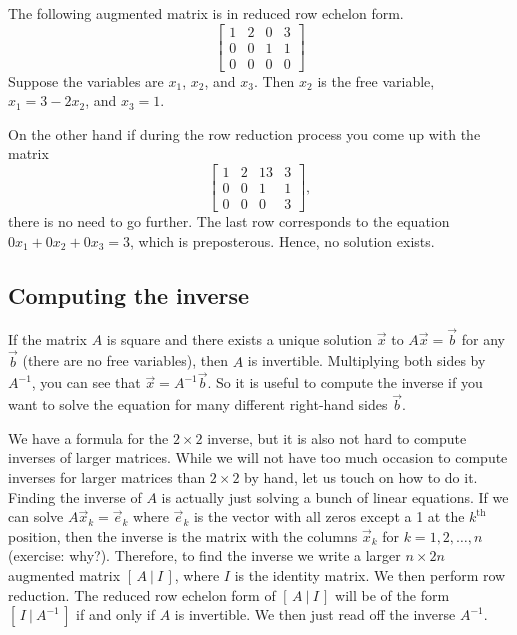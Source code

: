 \documentclass{ximera}
\begin{document}
\begin{example}
    The following augmented matrix is in reduced row echelon form.
    \begin{equation*}
        \left[
            \begin{array}{ccc|c}
                1 & 2 & 0 & 3 \\
                0 & 0 & 1 & 1 \\
                0 & 0 & 0 & 0
            \end{array}
        \right]
    \end{equation*}
    Suppose the variables are $x_1$, $x_2$, and $x_3$.  Then $x_2$ is the free variable, $x_1 = 3 - 2x_2$, and $x_3 = 1$.
    
    On the other hand if during the row reduction process you come up with the matrix
    \begin{equation*}
        \left[
            \begin{array}{ccc|c}
                1 & 2 & 13 & 3 \\
                0 & 0 & 1 & 1 \\
                0 & 0 & 0 & 3
            \end{array}
        \right],
    \end{equation*}
    there is no need to go further.  The last row corresponds to the equation $0 x_1 + 0 x_2 + 0 x_3 = 3$, which is preposterous.  Hence, no solution exists.
\end{example}

\subsection{Computing the inverse}

If the matrix $A$ is square and there exists a unique solution $\vec{x}$ to $A \vec{x} = \vec{b}$ for any $\vec{b}$ (there are no free variables), then $A$ is invertible. Multiplying both sides by $A^{-1}$, you can see that $\vec{x} = A^{-1} \vec{b}$.  So it is useful to compute the inverse if you want to solve the equation for many different right-hand sides $\vec{b}$.

We have a formula for 
the $2 \times 2$ inverse, but it is also not hard to compute inverses of larger matrices. While we will not have too much occasion to compute inverses for larger matrices than $2 \times 2$ by hand, let us touch on how to do it. Finding the inverse of $A$ is actually just solving a bunch of linear equations.  If we can solve $A \vec{x}_k = \vec{e}_k$ where $\vec{e}_k$ is the vector with all zeros except a 1 at the $k^{\text{th}}$ position, then the inverse is the matrix with the columns $\vec{x}_k$ for $k=1,2,\ldots,n$ (exercise: why?).  Therefore, to find the inverse we write a larger $n \times 2n$ augmented matrix $[ \,A ~|~ I\, ]$, where $I$ is the identity matrix. We then perform row reduction. The reduced row echelon form of $[ \,A ~|~ I\, ]$ will be of the form $[ \,I ~|~ A^{-1}\, ]$ if and only if $A$ is invertible.  We then just read off the inverse $A^{-1}$. 
\end{document}
